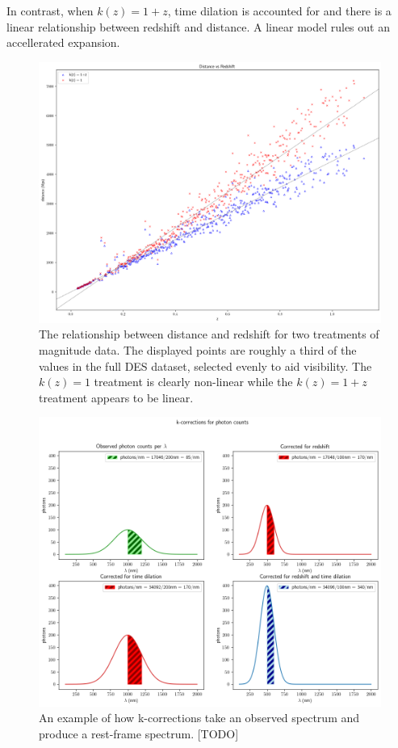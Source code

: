 \documentclass{article}
\begin{document}
In contrast, when $k(z) = 1 + z$, time dilation is accounted for and there is a
linear relationship between redshift and distance. A linear model rules out an
accellerated expansion.

\begin{figure}[h!]
  \includegraphics[width=\linewidth]{mu_distance_vs_redshift.png}
  \caption{The relationship between distance and redshift for two treatments of
  magnitude data. The displayed points are roughly a third of the values in the
  full DES dataset, selected evenly to aid visibility. The $k(z) = 1$ treatment
  is clearly non-linear while the $k(z) = 1 + z$ treatment appears to be
  linear.}
  \label{fig:mu_distance_vs_redshift}
\end{figure}

\begin{figure}[h!]
  \includegraphics[width=\linewidth]{k-corrections_for_photon_counts.png}
  \caption{An example of how k-corrections take an observed spectrum and
  produce a rest-frame spectrum. [TODO]
  }
  \label{fig:mu_distance_vs_redshift}
\end{figure}
\end{document}
